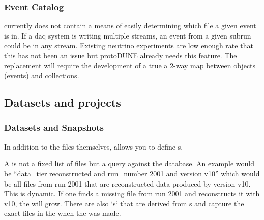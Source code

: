 \documentclass[../main-v1.tex]{subfiles}
\begin{document}
\subsubsection{Event Catalog}
 currently does not contain a means of easily determining which file a given event is in.  If a daq system is writing multiple streams, an event from a given subrun could be in any stream.   Existing neutrino experiments are low enough rate that this has not been an issue but protoDUNE already needs this feature.
The  replacement will require the development of a true a 2-way map between objects (events) and collections. 

 


\subsection{Datasets and projects}

\subsubsection{Datasets and Snapshots}

In addition to the files themselves,  allows you to define s.

A   is not a fixed list of files but a query against the  database. An example would be “data\_tier reconstructed and run\_number 2001 and version v10” which would be all files from run 2001 that are reconstructed data produced by version v10. This  is dynamic. If one finds a missing file from run 2001 and reconstructs it with v10, the  will grow. There are also  `s` that are derived from s and capture the exact files in the  when the  was made.



\end{document}
